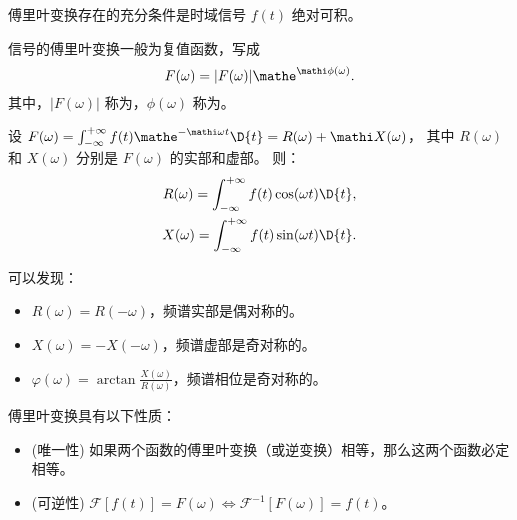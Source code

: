 \begin{theorem}
    傅里叶变换存在的充分条件是时域信号 $f(t)$ 绝对可积。
\end{theorem}

\begin{definition}[傅里叶频谱]
    信号的傅里叶变换一般为复值函数，写成
    \begin{equation}
        F(\omega) = |F(\omega)|\mathe^{\mathi\phi(\omega)}.
    \end{equation}
    其中，$|F(\omega)|$ 称为，$\phi(\omega)$ 称为。
\end{definition}

\begin{example}
    设 $F(\omega) = \int_{-\infty}^{+\infty}f(t)\mathe^{-\mathi \omega t}\D{t} = R(\omega) + \mathi X(\omega)$，
    其中 $R(\omega)$ 和 $X(\omega)$ 分别是 $F(\omega)$ 的实部和虚部。
    则：
    \begin{align*}
        R(\omega) = \int_{-\infty}^{+\infty} f(t)\cos(\omega t)\D{t}, \\
        X(\omega) = \int_{-\infty}^{+\infty} f(t)\sin(\omega t)\D{t}.
    \end{align*}

    可以发现：
    \begin{itemize}
        \item $R(\omega) = R(-\omega)$，频谱实部是偶对称的。
        \item $X(\omega) = -X(-\omega)$，频谱虚部是奇对称的。
        \item $\varphi(\omega) = \arctan\frac{X(\omega)}{R(\omega)}$，频谱相位是奇对称的。
    \end{itemize}
\end{example}

\begin{property}[傅里叶变换的性质]
    傅里叶变换具有以下性质：
    \begin{itemize}
        \item (唯一性) 如果两个函数的傅里叶变换（或逆变换）相等，那么这两个函数必定相等。
        \item (可逆性) $\mathcal{F}[f(t)] = F(\omega) \iff \mathcal{F}^{-1}[F(\omega)] = f(t)$。
    \end{itemize}
\end{property}
